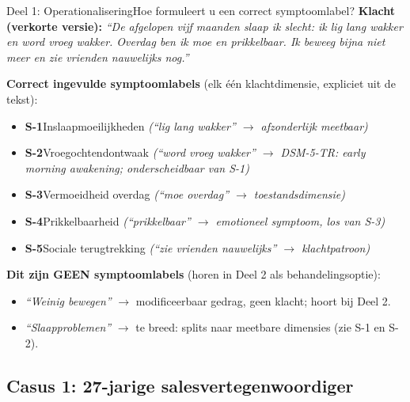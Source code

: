 \documentclass[11pt,a4paper]{article}
\begin{document}
\begin{voorbeeldbox}{Deel 1: Operationalisering}{Hoe formuleert u een correct symptoomlabel?}
\small
\textbf{Klacht (verkorte versie):} \textit{``De afgelopen vijf maanden slaap ik slecht:
ik lig lang wakker en word vroeg wakker. Overdag ben ik moe en prikkelbaar. Ik beweeg
bijna niet meer en zie vrienden nauwelijks nog.''}

\medskip
\textbf{Correct ingevulde symptoomlabels} (elk één klachtdimensie, expliciet uit de tekst):
\begin{itemize}[topsep=2pt,itemsep=1pt]
\item \textbf{S-1}\enspace Inslaapmoeilijkheden
  \hfill\textit{(``lig lang wakker'' $\rightarrow$ afzonderlijk meetbaar)}
\item \textbf{S-2}\enspace Vroegochtendontwaak
  \hfill\textit{(``word vroeg wakker'' $\rightarrow$ DSM-5-TR: early morning awakening; onderscheidbaar van S-1)}
\item \textbf{S-3}\enspace Vermoeidheid overdag
  \hfill\textit{(``moe overdag'' $\rightarrow$ toestandsdimensie)}
\item \textbf{S-4}\enspace Prikkelbaarheid
  \hfill\textit{(``prikkelbaar'' $\rightarrow$ emotioneel symptoom, los van S-3)}
\item \textbf{S-5}\enspace Sociale terugtrekking
  \hfill\textit{(``zie vrienden nauwelijks'' $\rightarrow$ klachtpatroon)}
\end{itemize}

\medskip
\textbf{\color{StrongRed}Dit zijn GEEN symptoomlabels} (horen in Deel 2 als behandelingsoptie):
\begin{itemize}[topsep=1pt,itemsep=0pt]
\item \textit{``Weinig bewegen''} $\rightarrow$ modificeerbaar gedrag, geen klacht; hoort bij Deel 2.
\item \textit{``Slaapproblemen''} $\rightarrow$ te breed: splits naar meetbare dimensies (zie S-1 en S-2).
\end{itemize}
\end{voorbeeldbox}

\vspace{0.5em}

\newpage

\subsection*{Casus 1: 27-jarige salesvertegenwoordiger}
\end{document}

